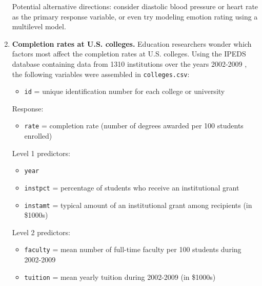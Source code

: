 \documentclass[
]{krantz}
\providecommand{\tightlist}{%
  \setlength{\itemsep}{0pt}\setlength{\parskip}{0pt}}
\begin{document}
\begin{enumerate}
  Potential alternative directions: consider diastolic blood pressure or heart rate as the primary response variable, or even try modeling emotion rating using a multilevel model.
\item
  \textbf{Completion rates at U.S. colleges.} Education researchers wonder which factors most affect the completion rates at U.S. colleges. Using the IPEDS database containing data from 1310 institutions over the years 2002-2009 \citep{IPEDS}, the following variables were assembled in \texttt{colleges.csv}:

  \begin{itemize}
  \tightlist
  \item
    \texttt{id} = unique identification number for each college or university
  \end{itemize}

  Response:

  \begin{itemize}
  \tightlist
  \item
    \texttt{rate} = completion rate (number of degrees awarded per 100 students enrolled)
  \end{itemize}

  Level 1 predictors:

  \begin{itemize}
  \tightlist
  \item
    \texttt{year}
  \item
    \texttt{instpct} = percentage of students who receive an institutional grant
  \item
    \texttt{instamt} = typical amount of an institutional grant among recipients (in \$1000s)
  \end{itemize}

  Level 2 predictors:

  \begin{itemize}
  \tightlist
  \item
    \texttt{faculty} = mean number of full-time faculty per 100 students during 2002-2009
  \item
    \texttt{tuition} = mean yearly tuition during 2002-2009 (in \$1000s)
  \end{itemize}


\end{enumerate}
\end{document}
